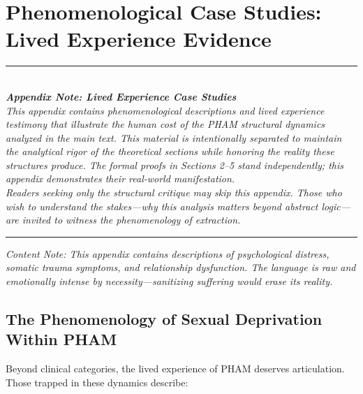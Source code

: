 \documentclass[12pt,openany]{book}
\numberwithin{equation}{chapter}
\begin{document}
\newpage
\appendix
\chapter{Phenomenological Case Studies: Lived Experience Evidence}

\begin{center}
\rule{0.6\textwidth}{0.4pt}\\[0.5em]
\textit{\textbf{Appendix Note: Lived Experience Case Studies}}\\[0.3em]
\textit{This appendix contains phenomenological descriptions and lived experience testimony that illustrate the human cost of the PHAM structural dynamics analyzed in the main text. This material is intentionally separated to maintain the analytical rigor of the theoretical sections while honoring the reality these structures produce. The formal proofs in Sections 2--5 stand independently; this appendix demonstrates their real-world manifestation.}\\[0.5em]
\textit{Readers seeking only the structural critique may skip this appendix. Those who wish to understand the stakes---why this analysis matters beyond abstract logic---are invited to witness the phenomenology of extraction.}\\[0.5em]
\rule{0.6\textwidth}{0.4pt}
\end{center}

\vspace{1em}

\textit{Content Note: This appendix contains descriptions of psychological distress, somatic trauma symptoms, and relationship dysfunction. The language is raw and emotionally intense by necessity---sanitizing suffering would erase its reality.}

\vspace{1em}

\section{The Phenomenology of Sexual Deprivation Within PHAM}

Beyond clinical categories, the lived experience of PHAM deserves articulation. Those trapped in these dynamics describe:
\end{document}
